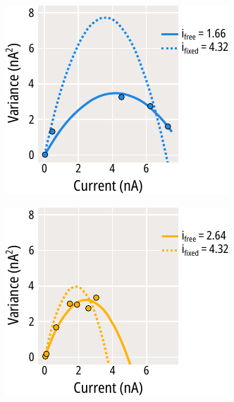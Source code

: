 \begin{figure}[hbtp]
\begin{subfigure}[t]{0.3\textwidth}
	\end{subfigure}
	\vfill
	\begin{subfigure}[t]{0.3\textwidth}
		\caption{}\label{ch4fig:noise_example_fits_1}
		\centering
		\includegraphics[width=\textwidth]{noise_example_fits_1.pdf}
	\end{subfigure}
	\hfill
	\begin{subfigure}[t]{0.3\textwidth}
		\caption{}\label{ch4fig:noise_example_fits_2}
		\centering
		\includegraphics[width=\textwidth]{noise_example_fits_2.pdf}

\end{subfigure}
\end{figure}
